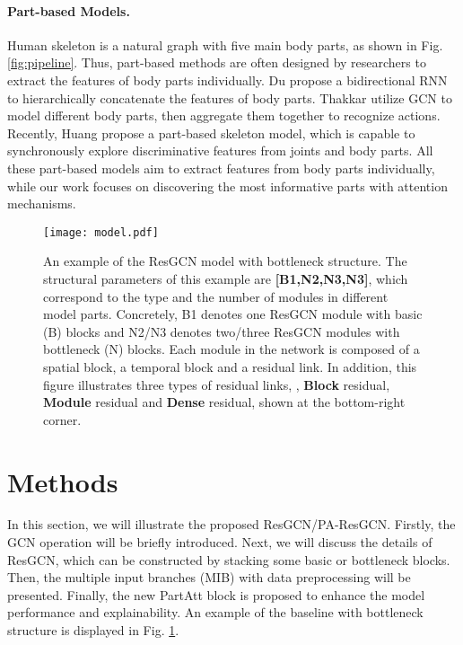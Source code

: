 \documentclass[sigconf]{acmart}
\begin{document}
\paragraph{Part-based Models.} Human skeleton is a natural graph with five main body parts, as shown in Fig. \ref{fig:pipeline}. Thus, part-based methods are often designed by researchers to extract the features of body parts individually. Du \etal \cite{du2015hierarchical} propose a bidirectional RNN to hierarchically concatenate the features of body parts. Thakkar \etal \cite{thakkar2018part} utilize GCN to model different body parts, then aggregate them together to recognize actions. Recently, Huang \etal \cite{huang2020part} propose a part-based skeleton model, which is capable to synchronously explore discriminative features from joints and body parts. All these part-based models aim to extract features from body parts individually, while our work focuses on discovering the most informative parts with attention mechanisms.

\begin{figure}
  \centerline{\texttt{[image: model.pdf]}}
  \caption{An example of the ResGCN model with bottleneck structure. The structural parameters of this example are {\bf [B1,N2,N3,N3]}, which correspond to the type and the number of modules in different model parts. Concretely, B1 denotes one ResGCN module with basic (B) blocks and N2/N3 denotes two/three ResGCN modules with bottleneck (N) blocks. Each module in the network is composed of a spatial block, a temporal block and a residual link. In addition, this figure illustrates three types of residual links, \ie, {\bf Block} residual, {\bf Module} residual and {\bf Dense} residual, shown at the bottom-right corner. \bv}\label{fig:model}
\end{figure}

\section{Methods}
\label{sec:methods}

In this section, we will illustrate the proposed ResGCN/PA-ResGCN. Firstly, the GCN operation will be briefly introduced. Next, we will discuss the details of ResGCN, which can be constructed by stacking some basic or bottleneck blocks. Then, the multiple input branches (MIB) with data preprocessing will be presented. Finally, the new PartAtt block is proposed to enhance the model performance and explainability. An example of the baseline with bottleneck structure is displayed in Fig. \ref{fig:model}.
\end{document}
